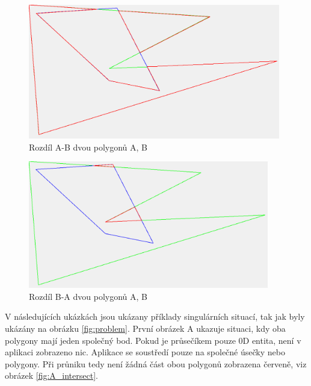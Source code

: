 \documentclass[a4paper,11pt,twoside]{article}
\begin{document}
\begin{figure}[hbt!] 
\begin{center}
\includegraphics[width=11cm]{pictures/polygon_diffAB.png} 
\caption[Rozdíl A-B dvou polygonů A, B]{Rozdíl A-B dvou polygonů A, B}
\label{fig:polygon_diffAB}
\end{center}
\end{figure}

\begin{figure}[hbt!] 
\begin{center}
\includegraphics[width=10.5cm]{pictures/polygon_diffBA.png} 
\caption[Rozdíl B-A dvou polygonů A, B]{Rozdíl B-A dvou polygonů A, B}
\label{fig:polygon_diffBA}
\end{center}
\end{figure}

V následujících ukázkách jsou ukázany příklady singulárních situací, tak jak byly ukázány na obrázku \ref{fig:problem}. První obrázek A ukazuje situaci, kdy oba polygony mají jeden společný bod. Pokud je průsečíkem pouze 0D entita, není v aplikaci zobrazeno nic. Aplikace se soustředí pouze na společné úsečky nebo polygony. Při průniku tedy není žádná část obou polygonů zobrazena červeně, viz obrázek \ref{fig:A_intersect}.
\end{document}

